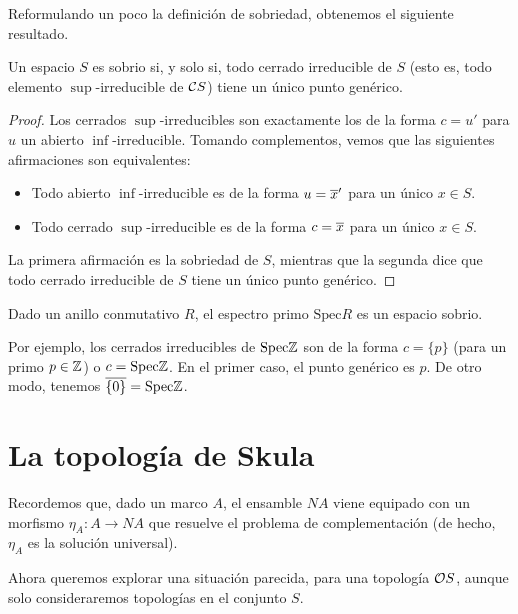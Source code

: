 Reformulando un poco la definición de sobriedad,
obtenemos el siguiente resultado.
\begin{lemma}
    Un espacio $S$ es sobrio si, y solo si,
    todo cerrado irreducible de $S$
    (esto es, todo elemento $\sup$-irreducible de $\cal CS$)
    tiene un único punto genérico.
\end{lemma}
\begin{proof}
    Los cerrados $\sup$-irreducibles son exactamente
    los de la forma $c=u'$ para $u$ un abierto $\inf$-irreducible.
    Tomando complementos, vemos que las siguientes afirmaciones
    son equivalentes:
    \begin{itemize}
         \item Todo abierto $\inf$-irreducible es de
         la forma $u=\ol{x}'$ para un único $x\in S$.
         \item Todo cerrado $\sup$-irreducible es de
         la forma $c=\ol x$ para un único $x\in S$.
    \end{itemize}
    La primera afirmación es la sobriedad de $S$,
    mientras que la segunda dice que todo cerrado
    irreducible de $S$ tiene un único punto genérico.
\end{proof}

\begin{exa}
    Dado un anillo conmutativo $R$,
    el espectro primo $\mathrm{Spec}R$ es un espacio sobrio.
    
    Por ejemplo, los cerrados irreducibles de $\mathrm{Spec}\Z$ son
    de la forma $c=\{p\}$ (para un primo $p\in\Z$) o $c=\mathrm{Spec}\Z$.
    En el primer caso, el punto genérico es $p$.
    De otro modo, tenemos $\ol{\{0\}}=\mathrm{Spec}\Z$.
\end{exa}


\section{La topología de Skula}

Recordemos que, dado un marco $A$, el ensamble $NA$ viene equipado con
un morfismo $\eta_A:A\to NA$ que resuelve el problema de complementación
(de hecho, $\eta_A$ es la solución universal).

Ahora queremos explorar una situación parecida, para una topología
$\cal OS$, aunque solo consideraremos topologías en el conjunto $S$.

